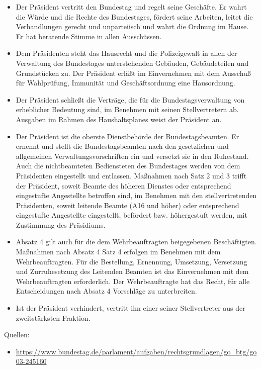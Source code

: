 \documentclass{article}
\begin{document}
	\begin{itemize}
		\item Der Präsident vertritt den Bundestag und regelt seine Geschäfte. Er wahrt die Würde und die Rechte des Bundestages, fördert seine Arbeiten, leitet die Verhandlungen gerecht und unparteiisch und wahrt die Ordnung im Hause. Er hat beratende Stimme in allen Ausschüssen.
		\item Dem Präsidenten steht das Hausrecht und die Polizeigewalt in allen der Verwaltung des Bundestages unterstehenden Gebäuden, Gebäudeteilen und Grundstücken zu. Der Präsident erläßt im Einvernehmen mit dem Ausschuß für Wahlprüfung, Immunität und Geschäftsordnung eine Hausordnung.
		\item Der Präsident schließt die Verträge, die für die Bundestagsverwaltung von erheblicher Bedeutung sind, im Benehmen mit seinen Stellvertretern ab. Ausgaben im Rahmen des Haushaltsplanes weist der Präsident an.
		\item Der Präsident ist die oberste Dienstbehörde der Bundestagsbeamten. Er ernennt und stellt die Bundestagsbeamten nach den gesetzlichen und allgemeinen Verwaltungsvorschriften ein und versetzt sie in den Ruhestand. Auch die nichtbeamteten Bediensteten des Bundestages werden von dem Präsidenten eingestellt und entlassen. Maßnahmen nach Satz 2 und 3 trifft der Präsident, soweit Beamte des höheren Dienstes oder entsprechend eingestufte Angestellte betroffen sind, im Benehmen mit den stellvertretenden Präsidenten, soweit leitende Beamte (A16 und höher) oder entsprechend eingestufte Angestellte eingestellt, befördert bzw. höhergestuft werden, mit Zustimmung des Präsidiums.
		\item Absatz 4 gilt auch für die dem Wehrbeauftragten beigegebenen Beschäftigten. Maßnahmen nach Absatz 4 Satz 4 erfolgen im Benehmen mit dem Wehrbeauftragten. Für die Bestellung, Ernennung, Umsetzung, Versetzung und Zurruhesetzung des Leitenden Beamten ist das Einvernehmen mit dem Wehrbeauftragten erforderlich. Der Wehrbeauftragte hat das Recht, für alle Entscheidungen nach Absatz 4 Vorschläge zu unterbreiten.
		\item Ist der Präsident verhindert, vertritt ihn einer seiner Stellvertreter aus der zweitstärksten Fraktion.
	\end{itemize}

	Quellen:
	\begin{itemize}
		\item \url{https://www.bundestag.de/parlament/aufgaben/rechtsgrundlagen/go_btg/go03-245160}
	\end{itemize}
\end{document}
